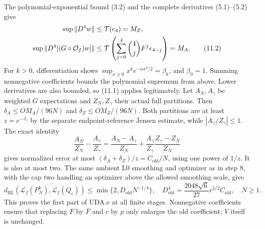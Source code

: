 The polynomial-exponential bound (3.2) and the complete derivatives
(5.1)--(5.2) give
\begin{align}
 \sup\|D^4w\|&\le\mathcal T(e_4)=M_Z,\notag\\
 \sup\|D^4[(G\circ\mathcal O_f)w]\|
 &\le\mathcal T\left(\sum_{j=0}^4\binom4jF^je_{4-j}\right)=M_A.\tag{11.2}
\end{align}
For $k>0$, differentiation shows
$\sup_{x\ge0}x^ke^{-\alpha x^4/2}=\beta_k$, and $\beta_0=1$.
Summing nonnegative coefficients bounds the polynomial supremum from above.
Lower derivatives are also bounded, so (11.1) applies legitimately.
Let $A_N,A_\gamma$ be weighted $G$ expectations and $Z_N,Z_\gamma$ their
actual full partitions. Then $\delta_A\le OM_A/(96N)$ and
$\delta_Z\le OM_Z/(96N)$. Both partitions are at least
$z=e^{-J_z}$ by the separate endpoint-reference Jensen estimate, while
$|A_\gamma/Z_\gamma|\le1$. The exact identity
\[
 \frac{A_N}{Z_N}-\frac{A_\gamma}{Z_\gamma}
 =\frac{A_N-A_\gamma}{Z_N}
 +\frac{A_\gamma}{Z_\gamma}\frac{Z_\gamma-Z_N}{Z_N}
\]
gives normalized error at most $(\delta_A+\delta_Z)/z=C_{\mathrm{old}}/N$,
using one power of $1/z$. It is also at most two. The same ambient L0
smoothing and optimizer as in step 8, with the cap two handling an
optimizer above the allowed smoothing scale, give
\begin{equation}
 d_{\mathrm{BL}}(\mathcal L_f(P_N^b),\mathcal L_f(Q_\epsilon))
 \le\min\{2,D_{\mathrm{old}}N^{-1/4}\},\quad
 D_{\mathrm{old}}^4=\frac{2048\sqrt6}{27}r^{3/2}C_{\mathrm{old}},
 \quad N\ge1.\tag{11.3}
\end{equation}
This proves the first part of UDA.e at all finite stages.
Nonnegative coefficients ensure that replacing $F$ by $\overline F$ and
$c$ by $p$ only enlarges the old coefficient; $V$ itself is unchanged.

